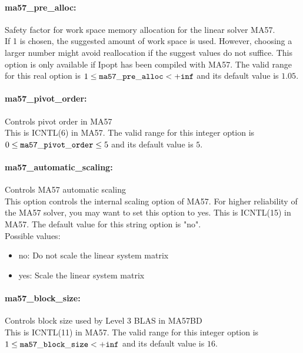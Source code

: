 \paragraph{ma57\_pre\_alloc:}\label{opt:ma57_pre_alloc} Safety factor for work space memory allocation for the linear solver MA57. \\
 If 1 is chosen, the suggested amount of work
space is used.  However, choosing a larger number
might avoid reallocation if the suggest values do
not suffice.  This option is only available if
Ipopt has been compiled with MA57. The valid range for this real option is 
$1 \le {\tt ma57\_pre\_alloc } <  {\tt +inf}$
and its default value is $1.05$.


\paragraph{ma57\_pivot\_order:}\label{opt:ma57_pivot_order} Controls pivot order in MA57 \\
 This is ICNTL(6) in MA57. The valid range for this integer option is
$0 \le {\tt ma57\_pivot\_order } \le 5$
and its default value is $5$.


\paragraph{ma57\_automatic\_scaling:}\label{opt:ma57_automatic_scaling} Controls MA57 automatic scaling \\
 This option controls the internal scaling option
of MA57. For higher reliability of the MA57
solver, you may want to set this option to yes.
This is ICNTL(15) in MA57. The default value for this string option is "no".
\\ 
Possible values:
\begin{itemize}
   \item no: Do not scale the linear system matrix
   \item yes: Scale the linear system matrix
\end{itemize}

\paragraph{ma57\_block\_size:}\label{opt:ma57_block_size} Controls block size used by Level 3 BLAS in MA57BD \\
 This is ICNTL(11) in MA57. The valid range for this integer option is
$1 \le {\tt ma57\_block\_size } <  {\tt +inf}$
and its default value is $16$.


